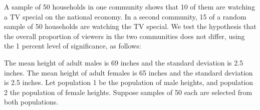 \item 
 A sample of 50 households in one community
 shows that 10 of them are watching a TV special on the national
 economy. In a second community, 15 of a random sample of 50
 households are watching the TV special. We test the hypothesis
 that the overall proportion of viewers in the two communities does
 not differ, using the 1 percent level of significance, as follows:
 
 
\item 
 The mean height of adult males is 69 inches and the standard
 deviation is 2.5 inches. The mean height of adult females is 65
 inches and the standard deviation is 2.5 inches. Let population 1
 be the population of male heights, and population 2 the population
 of female heights. Suppose samples of 50 each are selected from
 both populations.